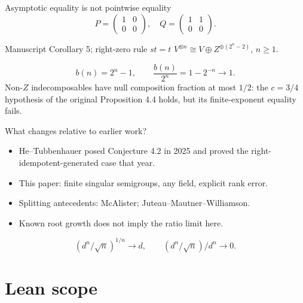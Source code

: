 \documentclass{beamer}
\begin{document}
\begin{frame}{Asymptotic equality is not pointwise equality}
\[
P=\begin{pmatrix}1&0\\0&0\end{pmatrix},\quad Q=\begin{pmatrix}1&1\\0&0\end{pmatrix}.
\]
\begin{block}{Manuscript Corollary 5; right-zero rule $st=t$}
$V^{\otimes n}\cong V\oplus Z^{\oplus(2^n-2)}$, $n\geq1$.
\end{block}
\[
b(n)=2^n-1,\qquad \frac{b(n)}{2^n}=1-2^{-n}\to1.
\]
Non-$Z$ indecomposables have null composition fraction at most $1/2$: the $c=3/4$ hypothesis of the original Proposition 4.4 holds, but its finite-exponent equality fails.
\end{frame}
\begin{frame}{What changes relative to earlier work?}
\begin{itemize}
\item He--Tubbenhauer posed Conjecture 4.2 in 2025 and proved the right-idempotent-generated case that year.
\item This paper: finite singular semigroups, any field, explicit rank error.
\item Splitting antecedents: McAlister; Juteau--Mautner--Williamson.
\item Known root growth does not imply the ratio limit here.
\end{itemize}
\[
(d^n/\sqrt n)^{1/n}\to d,\qquad (d^n/\sqrt n)/d^n\to0.
\]
\end{frame}
\section{Lean scope}
\end{document}
